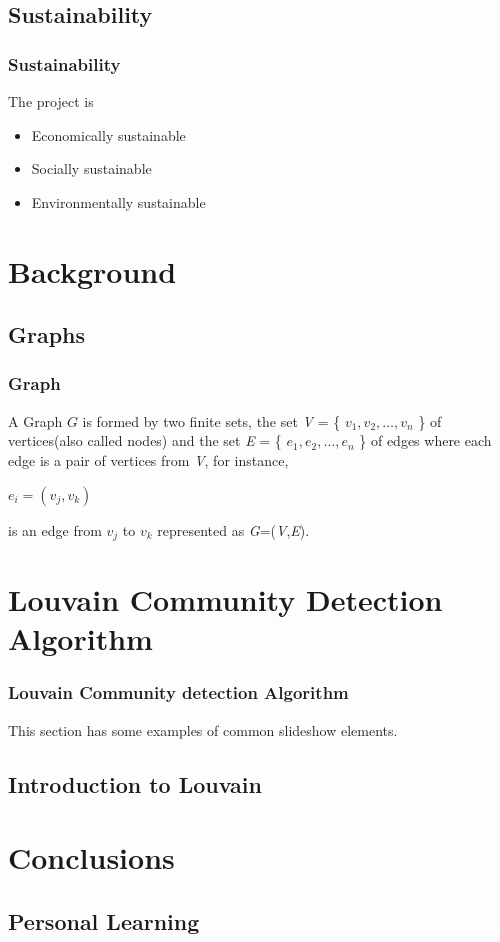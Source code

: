 \documentclass{beamer}
\begin{document}
\subsection{Sustainability}
\frame
{
\frametitle{Sustainability}
The project is 
\begin{itemize}
\item Economically sustainable
\item Socially sustainable
\item Environmentally sustainable
\end{itemize}
}
\section{Background}

\subsection[Few Theoretical Concepts]{Graphs}

\frame
{
	\frametitle{Graph}
	A Graph $G$ is formed by two finite sets, the set \textit{V} = \{ $v_1,v_2, \ldots ,v_n$ \} of vertices(also called nodes) and the set \textit{E} = \{ $e_1,e_2, \ldots,e_n$  \} of edges where each edge is a pair of vertices from \textit{V}, for instance,
\begin{center}
$e_i = (v_j,v_k)$
\end{center}
is an edge from $v_j$ to $v_k$ represented as \textit{G}=(\textit{V},\textit{E}).
}


\section{Louvain Community Detection Algorithm}

\frame
{
	\frametitle{Louvain Community detection Algorithm}

	This section has some examples of common slideshow elements.
}

\subsection{Introduction to Louvain}

\frame
{
	
}




\section{Conclusions}
\subsection{Personal Learning}
\end{document}
